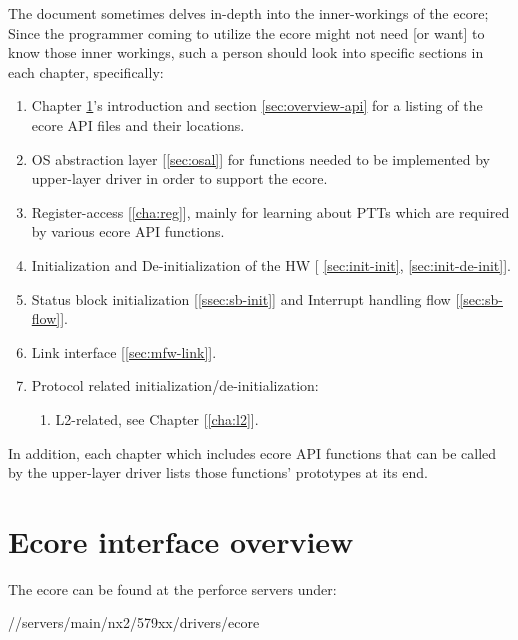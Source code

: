 \documentclass[11pt,fleqn,hidelinks,oneside]{book} %
\begin{document}
The document sometimes delves in-depth into the inner-workings of the ecore; Since the programmer coming to utilize the ecore might not need [or want] to know those inner workings, such a person should look into specific sections in each chapter, specifically:
\begin{enumerate}
	\item Chapter \ref{cha:overview}'s introduction and section \ref{sec:overview-api} for a listing of the ecore API files and their locations.

	\item OS abstraction layer [\ref{sec:osal}] for functions needed to be implemented by upper-layer driver in order to support the ecore.
	
	\item Register-access [\ref{cha:reg}], mainly for learning about PTTs which are required by various ecore API functions.
	
	\item Initialization and De-initialization of the HW [ \ref{sec:init-init}, \ref{sec:init-de-init}].
	
	\item Status block initialization [\ref{ssec:sb-init}] and Interrupt handling flow [\ref{sec:sb-flow}].
	
	\item Link interface [\ref{sec:mfw-link}].
	
	\item Protocol related initialization/de-initialization:
	\begin{enumerate}
		\item L2-related, see Chapter [\ref{cha:l2}].
	\end{enumerate}
\end{enumerate}

In addition, each chapter which includes ecore API functions that can be called by the upper-layer driver lists those functions' prototypes at its end.

%

\chapter{Ecore interface overview}
\label{cha:overview}
The ecore can be found at the perforce servers under:
\begin{center}
	//servers/main/nx2/579xx/drivers/ecore
\end{center}
\end{document}
